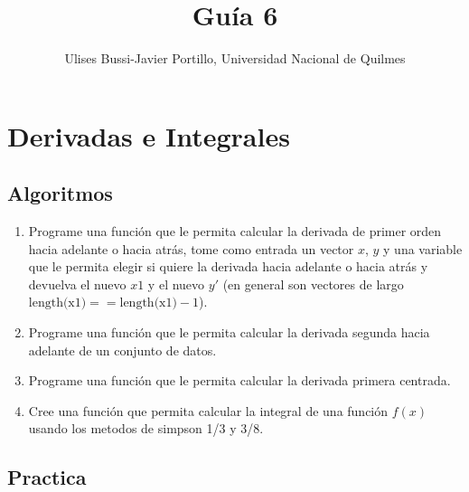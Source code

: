 \documentclass[a4paper,11pt]{article}
\makeatletter
\theoremstyle{mytheor}
\renewcommand{\maketitle}{
\colorbox{gray!20}{\framebox[\linewidth]{ \huge \textsc{\@title} } 
\lfoot{\@title}
}

}
\makeatother
\begin{document}
\title{Guía 6}

\author{Ulises Bussi-Javier Portillo, Universidad Nacional de Quilmes}


\maketitle \vspace{20pt}

\section*{Derivadas e Integrales}


\subsection*{Algoritmos}

\begin{enumerate}[label=\Roman*]

\item Programe una función que le permita calcular la derivada de primer orden hacia adelante o hacia atrás, tome como entrada un vector $x$, $y$ y una variable que le permita elegir si quiere la derivada hacia adelante o hacia atrás y devuelva el nuevo $x1$ y el nuevo $y'$ (en general son vectores de largo $\text{length(x1)}==\text{length(x1)}-1$).

\item Programe una función que le permita calcular la derivada segunda hacia adelante de un conjunto de datos.

\item Programe una función que le permita calcular la derivada primera centrada.


\item Cree una función que permita calcular la integral de una función $f(x)$ usando los metodos de simpson 1/3 y 3/8.

\end{enumerate}


\subsection*{Practica}
\end{document}
